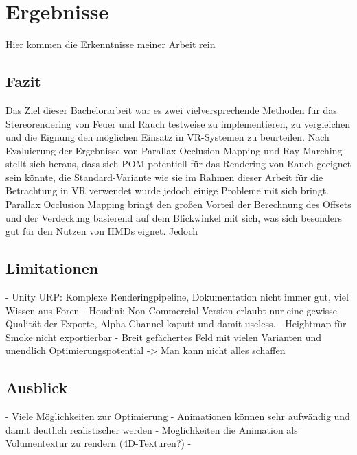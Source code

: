 \section{Ergebnisse}
\label{sec:6}
Hier kommen die Erkenntnisse meiner Arbeit rein
\subsection{Fazit}
\label{sec:6.1}
Das Ziel dieser Bachelorarbeit war es zwei vielversprechende Methoden für das Stereorendering von Feuer und Rauch testweise zu implementieren, 
zu vergleichen und die Eignung den möglichen Einsatz in VR-Systemen zu beurteilen. Nach Evaluierung der Ergebnisse von Parallax Occlusion Mapping
und Ray Marching stellt sich heraus, dass sich POM potentiell für das Rendering von Rauch geeignet sein könnte, die Standard-Variante wie sie im Rahmen 
dieser Arbeit für die Betrachtung in VR verwendet wurde jedoch einige Probleme mit sich bringt. Parallax Occlusion Mapping bringt den großen Vorteil
der Berechnung des Offsets und der Verdeckung basierend auf dem Blickwinkel mit sich, was sich besonders gut für den Nutzen von HMDs eignet. Jedoch 



\subsection{Limitationen}
\label{sec:6.2}

- Unity URP: Komplexe Renderingpipeline, Dokumentation nicht immer gut, viel Wissen aus Foren
- Houdini: Non-Commercial-Version erlaubt nur eine gewisse Qualität der Exporte, Alpha Channel kaputt und damit useless.
- Heightmap für Smoke nicht exportierbar
- Breit gefächertes Feld mit vielen Varianten und unendlich Optimierungspotential -> Man kann nicht alles schaffen





\subsection{Ausblick}
\label{sec:6.3}
- Viele Möglichkeiten zur Optimierung
- Animationen können sehr aufwändig und damit deutlich realistischer werden
- Möglichkeiten die Animation als Volumentextur zu rendern (4D-Texturen?)
- 

\newpage

